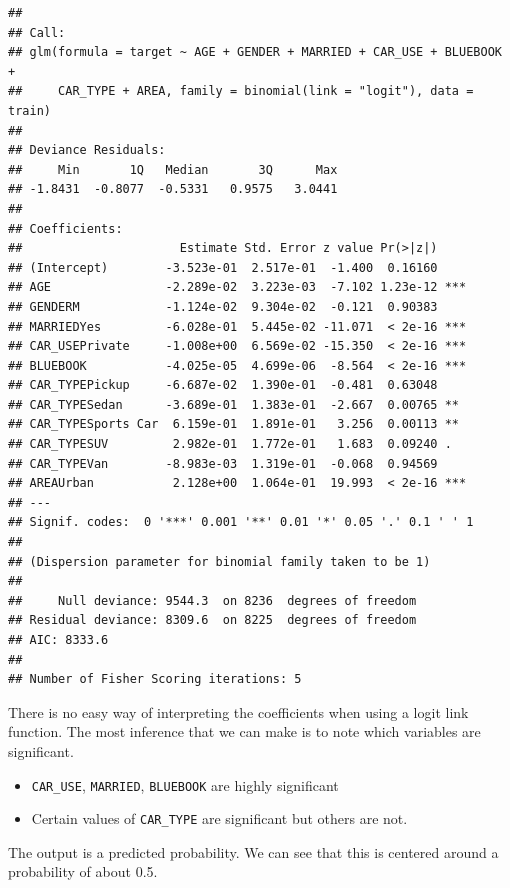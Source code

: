 \documentclass[]{book}
\newenvironment{Shaded}{\begin{snugshade}}{\end{snugshade}}
\newcommand{\KeywordTok}[1]{\textcolor[rgb]{0.13,0.29,0.53}{\textbf{#1}}}
\newcommand{\NormalTok}[1]{#1}
\newcommand{\OperatorTok}[1]{\textcolor[rgb]{0.81,0.36,0.00}{\textbf{#1}}}
\newcommand{\StringTok}[1]{\textcolor[rgb]{0.31,0.60,0.02}{#1}}
\providecommand{\tightlist}{%
  \setlength{\itemsep}{0pt}\setlength{\parskip}{0pt}}
\begin{document}
\begin{Shaded}
\end{Shaded}

\begin{verbatim}
## 
## Call:
## glm(formula = target ~ AGE + GENDER + MARRIED + CAR_USE + BLUEBOOK + 
##     CAR_TYPE + AREA, family = binomial(link = "logit"), data = train)
## 
## Deviance Residuals: 
##     Min       1Q   Median       3Q      Max  
## -1.8431  -0.8077  -0.5331   0.9575   3.0441  
## 
## Coefficients:
##                      Estimate Std. Error z value Pr(>|z|)    
## (Intercept)        -3.523e-01  2.517e-01  -1.400  0.16160    
## AGE                -2.289e-02  3.223e-03  -7.102 1.23e-12 ***
## GENDERM            -1.124e-02  9.304e-02  -0.121  0.90383    
## MARRIEDYes         -6.028e-01  5.445e-02 -11.071  < 2e-16 ***
## CAR_USEPrivate     -1.008e+00  6.569e-02 -15.350  < 2e-16 ***
## BLUEBOOK           -4.025e-05  4.699e-06  -8.564  < 2e-16 ***
## CAR_TYPEPickup     -6.687e-02  1.390e-01  -0.481  0.63048    
## CAR_TYPESedan      -3.689e-01  1.383e-01  -2.667  0.00765 ** 
## CAR_TYPESports Car  6.159e-01  1.891e-01   3.256  0.00113 ** 
## CAR_TYPESUV         2.982e-01  1.772e-01   1.683  0.09240 .  
## CAR_TYPEVan        -8.983e-03  1.319e-01  -0.068  0.94569    
## AREAUrban           2.128e+00  1.064e-01  19.993  < 2e-16 ***
## ---
## Signif. codes:  0 '***' 0.001 '**' 0.01 '*' 0.05 '.' 0.1 ' ' 1
## 
## (Dispersion parameter for binomial family taken to be 1)
## 
##     Null deviance: 9544.3  on 8236  degrees of freedom
## Residual deviance: 8309.6  on 8225  degrees of freedom
## AIC: 8333.6
## 
## Number of Fisher Scoring iterations: 5
\end{verbatim}

There is no easy way of interpreting the coefficients when using a logit link function. The most inference that we can make is to note which variables are significant.

\begin{itemize}
\tightlist
\item
  \texttt{CAR\_USE}, \texttt{MARRIED}, \texttt{BLUEBOOK} are highly significant
\item
  Certain values of \texttt{CAR\_TYPE} are significant but others are not.
\end{itemize}

The output is a predicted probability. We can see that this is centered around a probability of about 0.5.
\end{document}
